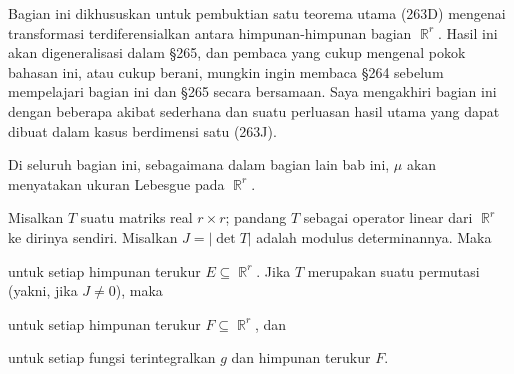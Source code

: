 
\def\diam{\mathop{\text{diam}}}
\def\dist{\mathop{\text{dist}}}

\def\chaptername{Perubahan variabel dalam integral}
\def\sectionname{Transformasi terdiferensialkan dalam $\BbbR^r$}


\def\headlinesectionname{Transformasi terdiferensialkan dalam
$\eightBbb R^r$}

Bagian ini dikhususkan untuk pembuktian satu teorema utama
(263D) mengenai transformasi terdiferensialkan antara himpunan-himpunan bagian
$\BbbR^r$.   Hasil ini akan digeneralisasi dalam \S265,
dan pembaca yang cukup mengenal pokok bahasan ini, atau cukup berani,
mungkin ingin membaca \S264 sebelum mempelajari bagian ini dan \S265
secara bersamaan.   Saya mengakhiri bagian ini dengan beberapa akibat sederhana dan suatu
perluasan hasil utama yang dapat dibuat dalam kasus berdimensi satu (263J).

Di seluruh bagian ini, sebagaimana dalam bagian lain bab ini, $\mu$ akan
menyatakan ukuran Lebesgue pada $\BbbR^r$.

 Misalkan $T$ suatu matriks real $r\times r$;  pandang
$T$ sebagai
operator linear dari $\BbbR^r$ ke dirinya sendiri.   Misalkan $J=|\det T|$ adalah
modulus determinannya.   Maka


\noindent untuk setiap himpunan terukur $E\subseteq\BbbR^r$.   Jika
$T$ merupakan suatu permutasi (yakni, jika $J\ne 0$), maka


\noindent untuk setiap himpunan terukur $F\subseteq\BbbR^r$, dan


\noindent untuk setiap fungsi terintegralkan $g$ dan himpunan terukur $F$.

